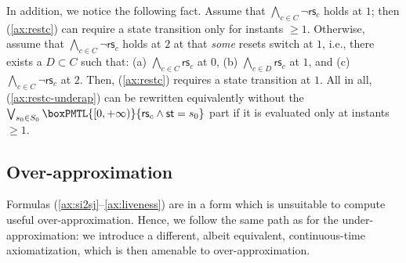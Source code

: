 \documentclass[a4paper]{article}
\newcommand{\frf}[1]{(\ref{#1})}
\newcommand{\fsrf}[2]{(\ref{#1}--\ref{#2})}
\newcommand{\st}{\mathsf{st}}
\newcommand{\rest}[1]{\mathsf{rs}_{#1}}
\theoremstyle{plain}
\theoremstyle{definition}
\begin{document}
In addition, we notice the following fact.
Assume that $\bigwedge_{c \in C}\neg\rest{c}$ holds at $1$; then \frf{ax:restc} can require a state transition only for instants $\geq 1$.
Otherwise, assume that $\bigwedge_{c \in C}\neg\rest{c}$ holds at $2$ at that \emph{some} resets switch at $1$, i.e., there exists a $D \subset C$ such that: (a) $\bigwedge_{c \in C} \rest{c}$ at $0$, (b) $\bigwedge_{c \in D} \rest{c}$ at $1$, and (c) $\bigwedge_{c \in C} \neg \rest{c}$ at $2$.
Then, \frf{ax:restc} requires a state transition at $1$.
All in all, \frf{ax:restc-underap} can be rewritten equivalently without the $\bigvee_{s_0 \in S_0} \boxPMTL{[0, +\infty)}{\rest{c} \wedge \st = s_0}$ part if it is evaluated only at instants $\geq 1$.





\subsection{Over-ap\-prox\-i\-ma\-tion}
Formulas \fsrf{ax:si2sj}{ax:liveness} are in a form which is unsuitable to compute useful over-ap\-prox\-i\-ma\-tion.
Hence, we follow the same path as for the under-ap\-prox\-i\-ma\-tion: we introduce a different, albeit equivalent, continuous-time axiomatization, which is then amenable to over-ap\-prox\-i\-ma\-tion.
\end{document}
